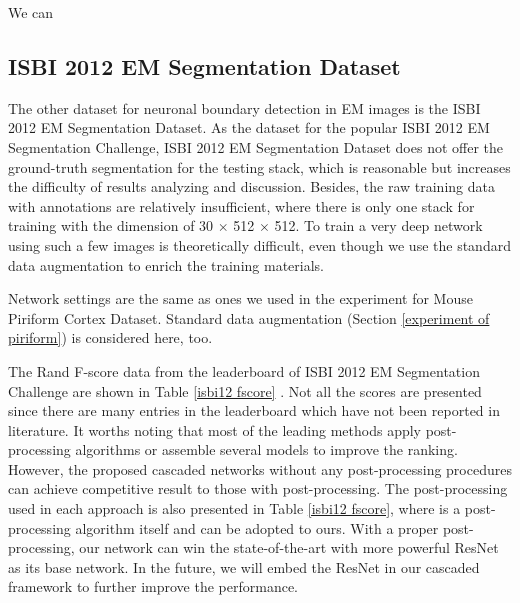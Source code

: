 \documentclass[senior]{IPSstyle}
\begin{document}
We can 

\subsection{ISBI 2012 EM Segmentation Dataset}
The other dataset for neuronal boundary detection in EM images is the ISBI 2012 EM Segmentation Dataset. As the dataset for the popular ISBI 2012 EM Segmentation Challenge, ISBI 2012 EM Segmentation Dataset does not offer the ground-truth segmentation for the testing stack, which is reasonable but increases the difficulty of results analyzing and discussion. Besides, the raw training data with annotations are relatively insufficient, where there is only one stack for training with the dimension of 30 \(\times\) 512 \(\times\) 512. To train a very deep network using such a few images is theoretically difficult, even though we use the standard data augmentation to enrich the training materials. 

Network settings are the same as ones we used in the experiment for Mouse Piriform Cortex Dataset\cite{Lee2015}. Standard data augmentation (Section \ref{experiment of piriform}) is considered here, too.

The Rand F-score data from the leaderboard of ISBI 2012 EM Segmentation Challenge are shown in Table \ref{isbi12 fscore} . Not all the scores are presented since there are many entries in the leaderboard which have not been reported in literature. It worths noting that most of the leading methods apply post-processing algorithms or assemble several models to improve the ranking. However, the proposed cascaded networks without any post-processing procedures can achieve competitive result to those with post-processing. 
The post-processing used in each approach is also presented in Table \ref{isbi12 fscore}, where \cite{Beier2016} is a post-processing algorithm itself and can be adopted to ours. With a proper post-processing, our network can win the state-of-the-art with more powerful ResNet\cite{He2016} as its base network. In the future, we will embed the ResNet\cite{He2016} in our cascaded framework to further improve the performance.
\end{document}
